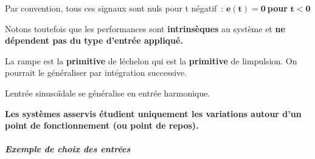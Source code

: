 Par convention, tous ces signaux sont nuls pour t négatif~:
\(\mathbf{e(t) = 0\ }\)\textbf{pour} \(\mathbf{t < 0}\)

Notons toutefois que les performances sont \textbf{intrinsèques} au
système et \textbf{ne dépendent pas du type d'entrée appliqué.}

La rampe est la \textbf{primitive} de l\textquotesingle échelon qui est
la \textbf{primitive} de l\textquotesingle impulsion. On pourrait le
généraliser par intégration successive.

L\textquotesingle entrée sinusoïdale se généralise en entrée harmonique.

\textbf{Les systèmes asservis étudient uniquement les variations autour
d'un point de fonctionnement (ou point de repos).}

\subparagraph*{Exemple de choix des
entrées}\label{exemple-de-choix-des-entruxe9es}

